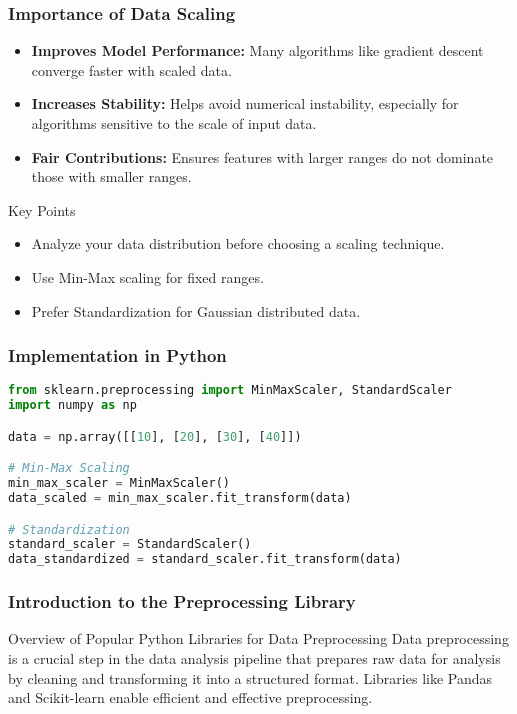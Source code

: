 \documentclass[aspectratio=169]{beamer}
\begin{document}
\begin{frame}[fragile]
  \frametitle{Importance of Data Scaling}
  \begin{itemize}
    \item \textbf{Improves Model Performance:} Many algorithms like gradient descent converge faster with scaled data.
    \item \textbf{Increases Stability:} Helps avoid numerical instability, especially for algorithms sensitive to the scale of input data.
    \item \textbf{Fair Contributions:} Ensures features with larger ranges do not dominate those with smaller ranges.
  \end{itemize}
  
  \begin{block}{Key Points}
    \begin{itemize}
      \item Analyze your data distribution before choosing a scaling technique.
      \item Use Min-Max scaling for fixed ranges.
      \item Prefer Standardization for Gaussian distributed data.
    \end{itemize}
  \end{block}
\end{frame}

\begin{frame}[fragile]
  \frametitle{Implementation in Python}
  \begin{lstlisting}[language=Python]
from sklearn.preprocessing import MinMaxScaler, StandardScaler
import numpy as np

data = np.array([[10], [20], [30], [40]])

# Min-Max Scaling
min_max_scaler = MinMaxScaler()
data_scaled = min_max_scaler.fit_transform(data)

# Standardization
standard_scaler = StandardScaler()
data_standardized = standard_scaler.fit_transform(data)
  \end{lstlisting}
\end{frame}

\begin{frame}
    \frametitle{Introduction to the Preprocessing Library}
    \begin{block}{Overview of Popular Python Libraries for Data Preprocessing}
        Data preprocessing is a crucial step in the data analysis pipeline that prepares raw data for analysis by cleaning and transforming it into a structured format. Libraries like Pandas and Scikit-learn enable efficient and effective preprocessing.
    \end{block}
\end{frame}
\end{document}
